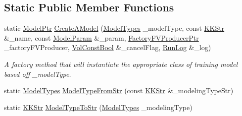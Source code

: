 \subsection*{Static Public Member Functions}
\begin{DoxyCompactItemize}
\item 
static \hyperlink{class_k_k_m_l_l_1_1_model_a9560fa355dc53fa82541f55582a6d6ea}{Model\+Ptr} \hyperlink{class_k_k_m_l_l_1_1_model_aab11308554985f9028773347aa185043}{Create\+A\+Model} (\hyperlink{class_k_k_m_l_l_1_1_model_aeda4060e088c67446ca993eefcecea06}{Model\+Types} \+\_\+model\+Type, const \hyperlink{class_k_k_b_1_1_k_k_str}{K\+K\+Str} \&\+\_\+name, const \hyperlink{class_k_k_m_l_l_1_1_model_param}{Model\+Param} \&\+\_\+param, \hyperlink{namespace_k_k_m_l_l_a82812d1feb85a6cff72d059bc67bb90e}{Factory\+F\+V\+Producer\+Ptr} \+\_\+factory\+F\+V\+Producer, \hyperlink{namespace_k_k_b_a7d390f568e2831fb76b86b56c87bf92f}{Vol\+Const\+Bool} \&\+\_\+cancel\+Flag, \hyperlink{class_k_k_b_1_1_run_log}{Run\+Log} \&\+\_\+log)
\begin{DoxyCompactList}\small\item\em A factory method that will instantiate the appropriate class of training model based off \textquotesingle{}\+\_\+model\+Type\textquotesingle{}. \end{DoxyCompactList}\item 
static \hyperlink{class_k_k_m_l_l_1_1_model_aeda4060e088c67446ca993eefcecea06}{Model\+Types} \hyperlink{class_k_k_m_l_l_1_1_model_a20e033472417caafa2cd577dcb7ae6a9}{Model\+Type\+From\+Str} (const \hyperlink{class_k_k_b_1_1_k_k_str}{K\+K\+Str} \&\+\_\+modeling\+Type\+Str)
\item 
static \hyperlink{class_k_k_b_1_1_k_k_str}{K\+K\+Str} \hyperlink{class_k_k_m_l_l_1_1_model_a27f60942199e9bfe1c48eb787089f325}{Model\+Type\+To\+Str} (\hyperlink{class_k_k_m_l_l_1_1_model_aeda4060e088c67446ca993eefcecea06}{Model\+Types} \+\_\+modeling\+Type)
\end{DoxyCompactItemize}
